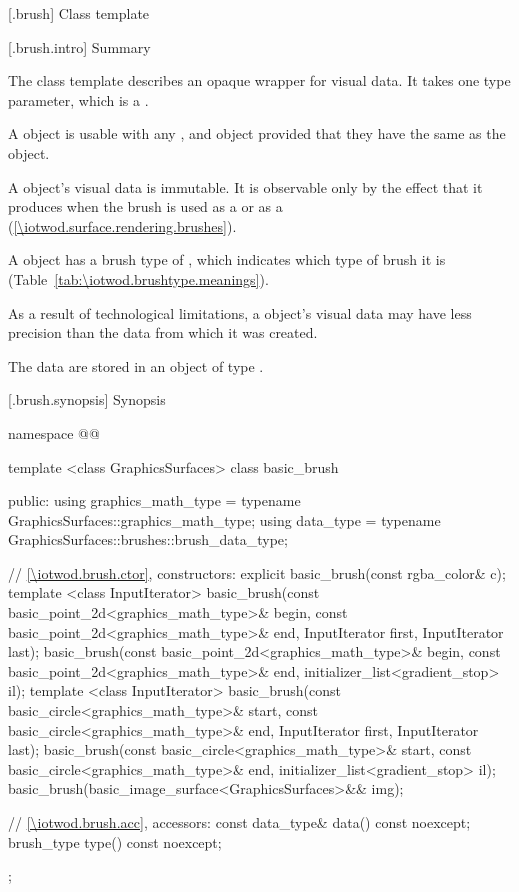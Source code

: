  [\iotwod.brush] {Class template }

 [\iotwod.brush.intro] {Summary}

\pnum
{}%
The class template  describes an opaque wrapper for visual data. It takes one type parameter, which is a \graphicssurfacestemplparamnospace.

\pnum
A  object is usable with any  , and  object provided that they have the same \graphicssurfacestemplparam as the  object.

\pnum
A  object's visual data is immutable. It is observable only by the effect that it produces when the brush is used as a  or as a  (\ref{\iotwod.surface.rendering.brushes}).

\pnum
A  object has a brush type of , which indicates which type of brush it is (Table~\ref{tab:\iotwod.brushtype.meanings}).

\pnum
As a result of technological limitations, a  object's visual data may have less precision than the data from which it was created.

\pnum
The data are stored in an object of type .

 [\iotwod.brush.synopsis] {Synopsis}

\begin{codeblock}
namespace @\fullnamespace{}@ {
  template <class GraphicsSurfaces>
  class basic_brush {
  public:
    using graphics_math_type = typename GraphicsSurfaces::graphics_math_type;
    using data_type = typename GraphicsSurfaces::brushes::brush_data_type;

    // \ref{\iotwod.brush.ctor}, constructors:
    explicit basic_brush(const rgba_color& c);
    template <class InputIterator>
    basic_brush(const basic_point_2d<graphics_math_type>& begin,
      const basic_point_2d<graphics_math_type>& end,
      InputIterator first, InputIterator last);
    basic_brush(const basic_point_2d<graphics_math_type>& begin,
      const basic_point_2d<graphics_math_type>& end,
      initializer_list<gradient_stop> il);
    template <class InputIterator>
    basic_brush(const basic_circle<graphics_math_type>& start,
      const basic_circle<graphics_math_type>& end,
      InputIterator first, InputIterator last);
    basic_brush(const basic_circle<graphics_math_type>& start,
      const basic_circle<graphics_math_type>& end,
      initializer_list<gradient_stop> il);
    basic_brush(basic_image_surface<GraphicsSurfaces>&& img);

	// \ref{\iotwod.brush.acc}, accessors:
    const data_type& data() const noexcept;
    brush_type type() const noexcept;
  };
}
\end{codeblock}

